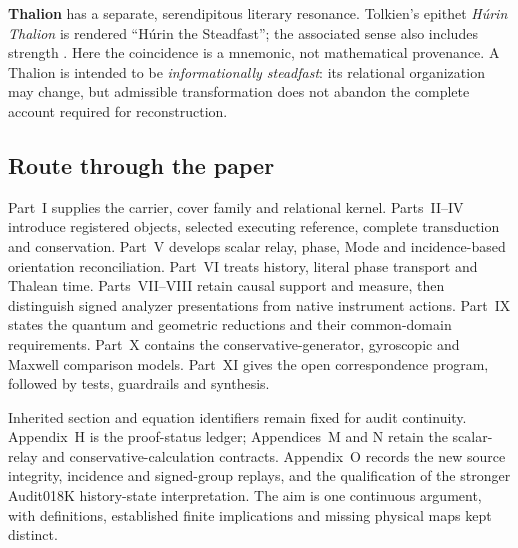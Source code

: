 \textbf{Thalion} has a separate, serendipitous literary resonance. Tolkien's epithet \emph{H\'{u}rin Thalion} is rendered ``H\'{u}rin the Steadfast''; the associated sense also includes strength \citep{fisherThalion}. Here the coincidence is a mnemonic, not mathematical provenance. A Thalion is intended to be \emph{informationally steadfast}: its relational organization may change, but admissible transformation does not abandon the complete account required for reconstruction.

\subsection*{Route through the paper}
Part~I supplies the carrier, cover family and relational kernel. Parts~II--IV introduce registered objects, selected executing reference, complete transduction and conservation. Part~V develops scalar relay, phase, Mode and incidence-based orientation reconciliation. Part~VI treats history, literal phase transport and Thalean time. Parts~VII--VIII retain causal support and measure, then distinguish signed analyzer presentations from native instrument actions. Part~IX states the quantum and geometric reductions and their common-domain requirements. Part~X contains the conservative-generator, gyroscopic and Maxwell comparison models. Part~XI gives the open correspondence program, followed by tests, guardrails and synthesis.

Inherited section and equation identifiers remain fixed for audit continuity. Appendix~H is the proof-status ledger; Appendices~M and N retain the scalar-relay and conservative-calculation contracts. Appendix~O records the new source integrity, incidence and signed-group replays, and the qualification of the stronger Audit018K history-state interpretation. The aim is one continuous argument, with definitions, established finite implications and missing physical maps kept distinct.
